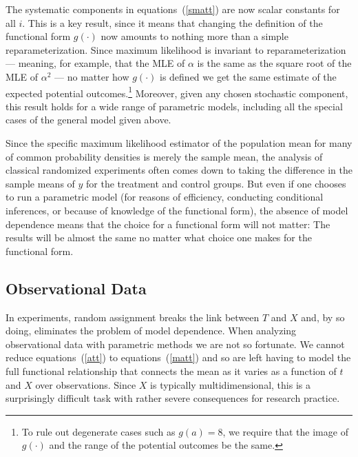 \documentclass[11pt,titlepage]{article}
\begin{document}
The systematic components in equations~(\ref{smatt}) are now scalar
constants for all $i$.  This is a key result, since it means that
changing the definition of the functional form $g(\cdot)$ now amounts
to nothing more than a simple reparameterization.  Since maximum
likelihood is invariant to reparameterization --- meaning, for
example, that the MLE of $\alpha$ is the same as the square root of
the MLE of $\alpha^2$ \citep[][p.75--76]{King89} --- no matter how
$g(\cdot)$ is defined we get the same estimate of the expected
potential outcomes.\footnote{To rule out degenerate cases such as
  $g(a)=8$, we require that the image of $g(\cdot)$ and the range of
  the potential outcomes be the same.} Moreover, given any chosen
stochastic component, this result holds for a wide range of 
parametric models, including all the special cases of the general
model given above.

Since the specific maximum likelihood estimator of the population mean
for many of common probability densities is merely the sample mean,
the analysis of classical randomized experiments often comes down to
taking the difference in the sample means of $y$ for the treatment and
control groups.  But even if one chooses to run a parametric model
(for reasons of efficiency, conducting conditional inferences, or
because of knowledge of the functional form), the absence of model
dependence means that the choice for a functional form will not
matter: The results will be almost the same no matter what choice one
makes for the functional form.

\subsection{Observational Data} \label{s:paraobs}

In experiments, random assignment breaks the link between $T$ and $X$
and, by so doing, eliminates the problem of model dependence.  When
analyzing observational data with parametric methods we are not so
fortunate.  We cannot reduce equations~(\ref{att}) to
equations~(\ref{matt}) and so are left having to model the full
functional relationship that connects the mean as it varies as a
function of $t$ and $X$ over observations.  Since $X$ is typically
multidimensional, this is a surprisingly difficult task with rather
severe consequences for research practice.
\end{document}
